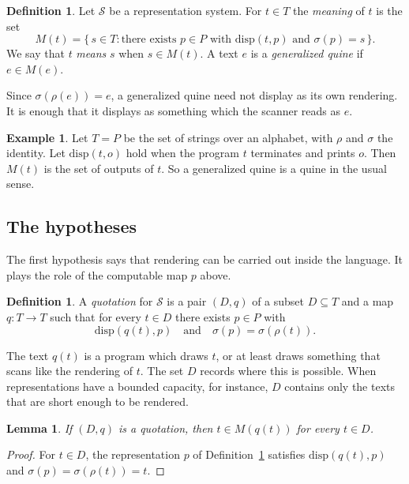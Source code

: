 \documentclass[11pt]{amsart}
\newtheorem{lemma}[theorem]{Lemma}
\theoremstyle{definition}
\newtheorem{definition}[theorem]{Definition}
\newtheorem{example}[theorem]{Example}
\theoremstyle{remark}
\newcommand{\disp}{\mathrm{disp}}
\newcommand{\rend}{\rho}
\newcommand{\scan}{\sigma}
\newcommand{\M}{M}
\begin{document}
\begin{definition}\label{def:meaning}
Let $\mathcal{S}$ be a representation system. For $t \in T$ the \emph{meaning} of $t$ is the set
\[
  \M(t) = \{\, s \in T : \text{there exists } p \in P \text{ with } \disp(t,p) \text{ and } \scan(p)
  = s \,\}.
\]
We say that $t$ \emph{means} $s$ when $s \in \M(t)$. A text $e$ is a \emph{generalized quine} if $e
\in \M(e)$.
\end{definition}

Since $\scan(\rend(e)) = e$, a generalized quine need not display as its own rendering. It is enough
that it displays as something which the scanner reads as $e$.

\begin{example}\label{ex:classical}
Let $T = P$ be the set of strings over an alphabet, with $\rend$ and $\scan$ the identity. Let
$\disp(t,o)$ hold when the program $t$ terminates and prints $o$. Then $\M(t)$ is the set of outputs
of $t$. So a generalized quine is a quine in the usual sense.
\end{example}

\subsection{The hypotheses}

The first hypothesis says that rendering can be carried out inside the language. It plays the role
of the computable map $p$ above.

\begin{definition}\label{def:quotation}
A \emph{quotation} for $\mathcal{S}$ is a pair $(D, q)$ of a subset $D \subseteq T$ and a map $q
\colon T \to T$ such that for every $t \in D$ there exists $p \in P$ with
\[
  \disp(q(t), p) \quad \text{and} \quad \scan(p) = \scan(\rend(t)).
\]
\end{definition}

The text $q(t)$ is a program which draws $t$, or at least draws something that scans like the
rendering of $t$. The set $D$ records where this is possible. When representations have a bounded
capacity, for instance, $D$ contains only the texts that are short enough to be rendered.

\begin{lemma}\label{lem:section}
If $(D,q)$ is a quotation, then $t \in \M(q(t))$ for every $t \in D$.
\end{lemma}

\begin{proof}
For $t \in D$, the representation $p$ of Definition~\ref{def:quotation} satisfies $\disp(q(t),p)$
and $\scan(p) = \scan(\rend(t)) = t$.
\end{proof}
\end{document}
